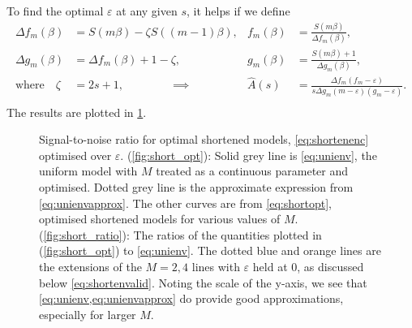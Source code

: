 \documentclass[12pt]{article}
\begin{document}
To find the optimal \(\varepsilon\) at any given \(s\), it helps if we define
%
\begin{equation*}
\begin{aligned}
  \Delta f_m(\beta) &= S(m\beta) - \zeta S((m-1)\beta), &
  f_m(\beta) &= \frac{S(m\beta)}{\Delta f_m(\beta)}, \\
  \Delta g_m(\beta) &= \Delta f_m(\beta) + 1 - \zeta , &
  g_m(\beta) &= \frac{S(m\beta) + 1}{\Delta g_m(\beta)}, \\
  \text{where}\quad \zeta &= 2s + 1, 
  \qquad\qquad \implies & 
  \hat{A}(s) &= \frac{\Delta f_{m} (f_m - \varepsilon)}
           {s \Delta g_{m} (m - \varepsilon) (g_m - \varepsilon)}.
  \\
\end{aligned}
\end{equation*}
%
The results are plotted in \cref{fig:shorten}.

\begin{figure}[ht]
\begin{center}
\begin{myenuma}
  \item\label{fig:short_opt}
  \item\label{fig:short_ratio}
\end{myenuma}
\caption[Signal-to-noise ratio for optimal shortened models]
{Signal-to-noise ratio for optimal shortened models, \cref{eq:shortenenc} optimised over \(\varepsilon\).
(\ref{fig:short_opt}): Solid grey line is \cref{eq:unienv}, the uniform model with \(M\) treated as a continuous parameter and optimised.
Dotted grey line is the approximate expression from \cref{eq:unienvapprox}.
The other curves are from \cref{eq:shortopt}, optimised shortened models for various values of \(M\).
(\ref{fig:short_ratio}): The ratios of the quantities plotted in (\ref{fig:short_opt}) to \cref{eq:unienv}.
The dotted blue and orange lines are the extensions of the \(M=2,4\) lines with \(\varepsilon\) held at 0, as discussed below \cref{eq:shortenvalid}.
Noting the scale of the y-axis, we see that \cref{eq:unienv,eq:unienvapprox} do provide good approximations, especially for larger \(M\).
\label{fig:shorten}}
\end{center}
\end{figure}
\end{document}

